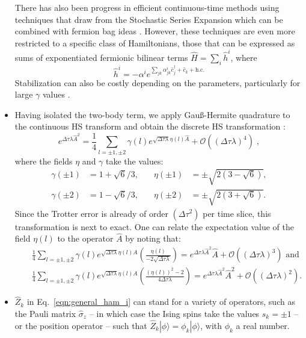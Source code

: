 \begin{itemize}
There has also been progress in efficient continuous-time methods using techniques that draw from the Stochastic Series Expansion \cite{Wang16} which can be combined with fermion bag ideas \cite{Huffman17}. However, these techniques are even more restricted to a specific class of Hamiltonians, those that can be expressed as sums of exponentiated fermionic bilinear terms $\hat{H} = \sum_i \hat{h}^i$, where
\begin{equation}
\hat{h}^i = -\alpha^i e^{\sum_{jk} \alpha^i_{jk} \hat{c}^\dagger_j + \hat{c}_k + \mathrm{h.c.} }
\end{equation}
Stabilization can also be costly depending on the parameters, particularly for large $\gamma$ values \cite{huffman2019}.
\item  Having isolated the two-body term, we apply Gau\ss{}-Hermite quadrature \cite{goth2020} to the 
continuous HS transform and obtain the discrete HS transformation \cite{Motome97,Assaad97}:
\begin{equation}
\label{HS_squares}
        e^{\Delta \tau  \lambda  \hat{A}^2 } = \frac{1}{4}
        \sum_{ l = \pm 1, \pm 2}  \gamma(l)
e^{ \sqrt{\Delta \tau \lambda }
       \eta(l)  \hat{A} }
                + \mathcal{O} \left(  (\Delta \tau \lambda)^4\right) \;,
\end{equation}
where the fields $\eta$ and $\gamma$ take the values:
\begin{equation} \label{eta_gamma_fields}
\begin{aligned}
\gamma(\pm 1) &= 1 + \sqrt{6}/3, \quad & \eta(\pm 1 ) &= \pm \sqrt{2 \left(3 - \sqrt{6} \right)},\\
\gamma(\pm 2) &= 1 - \sqrt{6}/3, \quad & \eta(\pm 2 ) &= \pm \sqrt{2 \left(3 + \sqrt{6} \right)}.
\end{aligned}
\end{equation}
Since the Trotter error is already of order $(\Delta \tau ^2) $ per time slice, this transformation is next to exact.
One can relate the expectation value of the field $\eta(l)$ to the operator $\hat{A}$  by noting that:
\begin{eqnarray} 
    & &  \frac{1}{4} \sum_{l = \pm 1, \pm 2} \gamma(l) e^{\sqrt{ \Delta \tau \lambda} \eta(l) \hat{A}} \left( \frac{\eta(l)}{-2 \sqrt{ \Delta \tau \lambda}  } \right)    =   e^{ \Delta \tau \lambda  \hat{A}^2}  \hat{A}  +   \mathcal{O}  \left( (\Delta \tau \lambda)^3\right)   \text{  and } \nonumber \\  
     & &    \frac{1}{4} \sum_{l = \pm 1, \pm 2} \gamma(l) e^{\sqrt{ \Delta \tau \lambda} \eta(l) \hat{A}} \left( \frac{(\eta(l))^2 - 2}{4 \Delta \tau \lambda  } \right)    =   e^{ \Delta \tau \lambda  \hat{A}^2}  \hat{A}^2  +   \mathcal{O}  \left( (\Delta \tau \lambda)^2\right).
\end{eqnarray}
\item $\hat{Z}_k$ in Eq.~\eqref{eqn:general_ham_i} can stand for a variety of operators, such as the Pauli matrix $\hat{\sigma}_{z}$ -- in which case the Ising spins take the values $s_{k} = \pm 1$ -- or the position operator -- such that $ \hat{Z}_k | \phi\rangle = \phi_k  |\phi\rangle $, with $\phi_k$ a real number.  


\end{itemize}
